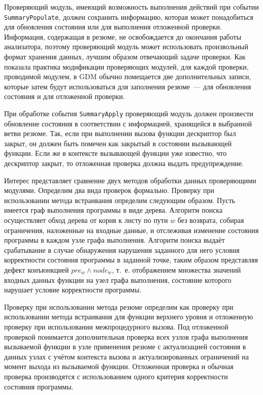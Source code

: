 Проверяющий модуль, имеющий возможность выполнения действий при событии \texttt{SummaryPopulate}, должен сохранить информацию, которая может понадобиться для обновления состояния или для выполнения отложенной проверки. Информация, содержащая в резюме, не освобождается до окончания работы анализатора, поэтому проверяющий модуль может использовать произвольный формат хранения данных, лучшим образом отвечающий задаче проверки. Как показала практика модификации проверяющих модулей, для каждой проверки, проводимой модулем, в GDM обычно помещается две дополнительных записи, которые затем будут использоваться для заполнения резюме~--- для обновления состояния и для отложенной проверки.

При обработке события \texttt{SummaryApply} проверяющий модуль должен произвести обновление состояния в соответствии с информацией, хранящейся в выбранной ветви резюме. Так, если при выполнении вызова функции дескриптор был закрыт, он должен быть помечен как закрытый в состоянии вызывающей функции. Если же в контексте вызывающей функции уже известно, что дескриптор закрыт, то отложенная проверка должна выдать предупреждение.

Интерес представляет сравнение двух методов обработки данных проверяющими модулями. Определим два вида проверок формально. Проверку при использовании метода встраивания определим следующим образом. Пусть имеется граф выполнения программы в виде дерева. Алгоритм поиска осуществляет обход дерева от корня к листу по пути $w$ без возврата, собирая ограничения, наложенные на входные данные, и отслеживая изменение состояния программы в каждом узле графа выполнения. Алгоритм поиска выдаёт срабатывание в случае обнаружения нарушения заданного для него условия корректности состояния программы в заданной точке, таким образом представляя дефект конъюнкцией $pre_w \wedge node_w$, т.~е. отображением множества значений входных данных функции на узел графа выполнения, состояние которого нарушает условие корректности программы.

Проверку при использовании метода резюме определим как проверку при использовании метода встраивания для функции верхнего уровня и отложенную проверку при использовании межпроцедурного вызова. Под отложенной проверкой понимается дополнительная проверка всех узлов графа выполнения вызываемой функции в узле применения резюме с актуализацией состояния в данных узлах с учётом контекста вызова и актуализированных ограничений на момент выхода из вызываемой функции. Отложенная проверка и обычная проверка производятся с использованием одного критерия корректности состояния программы.

